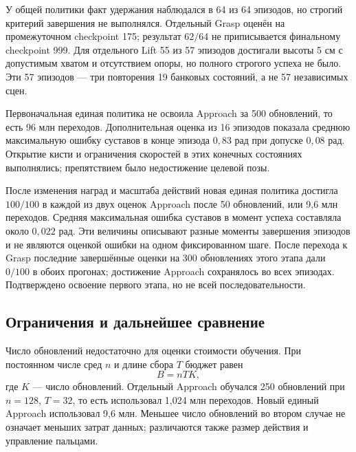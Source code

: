 \documentclass{misisarticle}
\begin{document}
\begin{table}[tb]
\caption{Предварительные оценки: разные задачи и условия старта}
\label{tab:results}
\centering\small

\end{table}

У общей политики факт удержания наблюдался в 64 из 64 эпизодов, но строгий критерий завершения не выполнялся. Отдельный Grasp оценён на промежуточном checkpoint 175; результат $62/64$ не приписывается финальному checkpoint 999. Для отдельного Lift 55 из 57 эпизодов достигали высоты 5 см с допустимым хватом и отсутствием опоры, но полного строгого успеха не было. Эти 57 эпизодов --- три повторения 19 банковых состояний, а не 57 независимых сцен.

Первоначальная единая политика не освоила Approach за 500 обновлений, то есть 96 млн переходов. Дополнительная оценка из 16 эпизодов показала среднюю максимальную ошибку суставов в конце эпизода $0{,}83$ рад при допуске $0{,}08$ рад. Открытие кисти и ограничения скоростей в этих конечных состояниях выполнялись; препятствием было недостижение целевой позы.

После изменения наград и масштаба действий новая единая политика достигла $100/100$ в каждой из двух оценок Approach после 50 обновлений, или 9,6 млн переходов. Средняя максимальная ошибка суставов в момент успеха составляла около $0{,}022$ рад. Эти величины описывают разные моменты завершения эпизодов и не являются оценкой ошибки на одном фиксированном шаге. После перехода к Grasp последние завершённые оценки на 300 обновлениях этого этапа дали $0/100$ в обоих прогонах; достижение Approach сохранялось во всех эпизодах. Подтверждено освоение первого этапа, но не всей последовательности.

\subsection{Ограничения и дальнейшее сравнение}
Число обновлений недостаточно для оценки стоимости обучения. При постоянном числе сред $n$ и длине сбора $T$ бюджет равен
\begin{equation}
 B=nTK,
\end{equation}
где $K$ --- число обновлений. Отдельный Approach обучался 250 обновлений при $n=128$, $T=32$, то есть использовал 1,024 млн переходов. Новый единый Approach использовал 9,6 млн. Меньшее число обновлений во втором случае не означает меньших затрат данных; различаются также размер действия и управление пальцами.
\end{document}
